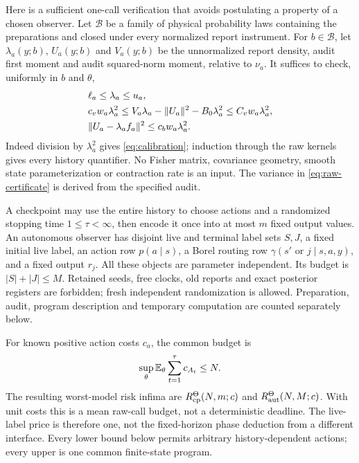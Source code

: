 Here is a sufficient one-call verification that avoids postulating a property of a chosen observer. Let $\mathcal B$ be a family of physical probability laws containing the preparations and closed under every normalized report instrument. For $b\in\mathcal B$, let $\lambda_a(y;b)$, $U_a(y;b)$ and $V_a(y;b)$ be the unnormalized report density, audit first moment and audit squared-norm moment, relative to $\nu_a$. It suffices to check, uniformly in $b$ and $\theta$,
\begin{align}
 &\ell_a\le\lambda_a\le u_a,\label{eq:raw-certificate}\\
 &c_vw_a\lambda_a^2\le V_a\lambda_a-\|U_a\|^2-B_0\lambda_a^2
       \le C_vw_a\lambda_a^2,\notag\\
 &\|U_a-\lambda_af_a\|^2\le c_bw_a\lambda_a^2.\notag
\end{align}
Indeed division by $\lambda_a^2$ gives \eqref{eq:calibration}; induction through the raw kernels gives every history quantifier. No Fisher matrix, covariance geometry, smooth state parameterization or contraction rate is an input. The variance in \eqref{eq:raw-certificate} is derived from the specified audit.

A checkpoint may use the entire history to choose actions and a randomized stopping time $1\le\tau<\infty$, then encode it once into at most $m$ fixed output values. An autonomous observer has disjoint live and terminal label sets $S,J$, a fixed initial live label, an action row $p(a\mid s)$, a Borel routing row $\gamma(s'\text{ or }j\mid s,a,y)$, and a fixed output $r_j$. All these objects are parameter independent. Its budget is $|S|+|J|\le M$. Retained seeds, free clocks, old reports and exact posterior registers are forbidden; fresh independent randomization is allowed. Preparation, audit, program description and temporary computation are counted separately below.

For known positive action costs $c_a$, the common budget is
\[
 \sup_\theta\mathbb E_\theta\sum_{t=1}^{\tau}c_{A_t}\le N.
\]
The resulting worst-model risk infima are $R_{\mathrm{cp}}^\Theta(N,m;c)$ and $R_{\mathrm{aut}}^\Theta(N,M;c)$. With unit costs this is a mean raw-call budget, not a deterministic deadline. The live-label price is therefore one, not the fixed-horizon phase deduction from a different interface. Every lower bound below permits arbitrary history-dependent actions; every upper is one common finite-state program.
